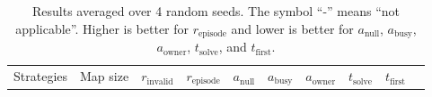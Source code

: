 \documentclass[letterpaper]{article}
\begin{document}



\begin{table}[tb]
    \centering
\caption{Results averaged over 4 random seeds. The symbol ``-'' means ``not applicable''. Higher is better for $r_{\text{episode}}$ and lower is better for $a_\text{null}$,  $a_\text{busy}$, $a_\text{owner}$,  $t_\text{solve}$, and  $t_\text{first}$.}
\begin{small}
\begin{tabular}{lllrrrrrll}
\toprule
Strategies & Map size & $r_{\text{invalid}}$ &    $r_{\text{episode}}$  &  $a_\text{null}$ &  $a_\text{busy}$ &  $a_\text{owner}$ &  $t_\text{solve}$ &  $t_\text{first}$ \\


\end{tabular}
\end{small}
\end{table}
\end{document}
